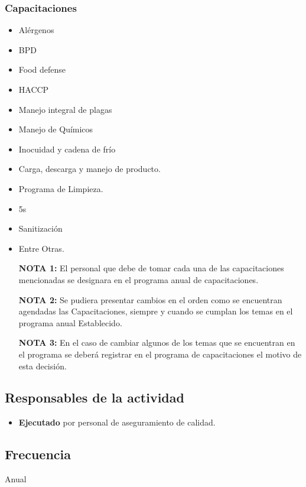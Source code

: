 \subsubsection{Capacitaciones}
\begin{itemize}
	\item Alérgenos
	\item BPD
	\item Food defense
	\item HACCP
	\item Manejo integral de plagas
	\item Manejo de Químicos
	\item Inocuidad y cadena de frío
	\item Carga, descarga y manejo de producto.
	\item Programa de Limpieza.
	\item 5s
	\item Sanitización
	\item Entre Otras.
\item[\textbf{NOTA 1:}] El personal que debe de tomar cada una de las capacitaciones mencionadas se designara en el programa anual de capacitaciones.
\item[\textbf{NOTA 2:}] Se pudiera presentar cambios en el orden como se encuentran agendadas las
Capacitaciones, siempre y cuando se cumplan los temas en el programa anual
Establecido.
\item[\textbf{NOTA 3:}] En el caso de cambiar algunos de los temas que se encuentran en el programa se deberá registrar en el programa de capacitaciones el motivo de esta decisión.
\end{itemize}

\subsection{Responsables de la actividad}
\begin{itemize}
	\item \textbf{Ejecutado} por personal de aseguramiento de calidad.
\end{itemize}

\subsection{Frecuencia}
Anual

